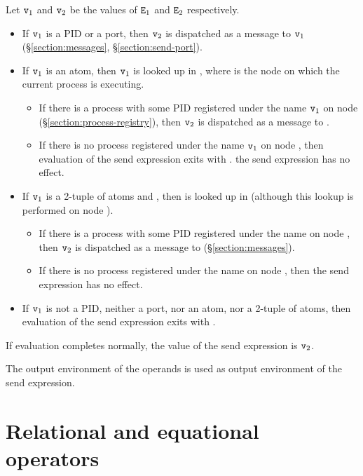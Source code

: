 Let ${\tt{\sl v}}_1$ and ${\tt{\sl v}}_2$ be the values of ${\tt{\sl E}}_1$ and
${\tt{\sl E}}_2$ respectively.
\begin{itemize}
\item If ${\tt{\sl v}}_1$ is a PID or a port,
then ${\tt{\sl v}}_2$ is dispatched as a message to ${\tt{\sl v}}_1$
(\S\ref{section:messages}, \S\ref{section:send-port}).
\item If ${\tt{\sl v}}_1$ is an atom, then ${\tt{\sl v}}_1$ is looked up in
, where  is the node on which the current
process is executing.
\begin{itemize}
\item If there is a process with some PID 
registered under the name ${\tt{\sl v}}_1$ on node
 (\S\ref{section:process-registry}), then ${\tt{\sl v}}_2$ is
dispatched as a message to .
\item If there is no process registered under the name ${\tt{\sl v}}_1$ on
node , then
\ifOld evaluation of  the send expression exits with . \fi
\ifStd the send expression has no effect. \fi
\end{itemize}
\item If ${\tt{\sl v}}_1$ is a 2-tuple of atoms  and , then
 is looked up in  (although this lookup is
performed on node ).
\begin{itemize}
\item If there is a process with some PID  registered under the name 
on node , then ${\tt{\sl v}}_2$ is dispatched as a message to 
(\S\ref{section:messages}).
\item If there is no process registered under the name  on node , then
the send expression has no effect.
\end{itemize}
\item If ${\tt{\sl v}}_1$ is not a PID, neither a port, nor an atom, nor a
2-tuple of atoms, then
evaluation of the send expression exits with .
\end{itemize}

If evaluation completes normally, the value of the send expression is
${\tt{\sl v}}_2$.

\ENVIRONMENTS

The output environment of the operands is used as output environment
of the send expression.

\section{Relational and equational operators}

